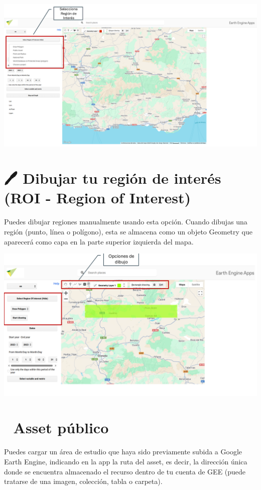 \documentclass[
]{book}
\begin{document}
\includegraphics{assets/ROI_es.png}

\section{\texorpdfstring{\textbf{🖊️ Dibujar tu región de interés (ROI - Region of Interest)}}{🖊️ Dibujar tu región de interés (ROI - Region of Interest)}}\label{dibujar-tu-regiuxf3n-de-interuxe9s-roi---region-of-interest}

Puedes dibujar regiones manualmente usando esta opción. Cuando dibujas una región (punto, línea o polígono), esta se almacena como un objeto Geometry que aparecerá como capa en la parte superior izquierda del mapa.

\includegraphics{assets/dibujado.png}

\section{\texorpdfstring{\textbf{📂 Asset público}}{📂 Asset público}}\label{asset-puxfablico}

Puedes cargar un área de estudio que haya sido previamente subida a Google Earth Engine, indicando en la app la ruta del asset, es decir, la dirección única donde se encuentra almacenado el recurso dentro de tu cuenta de GEE (puede tratarse de una imagen, colección, tabla o carpeta).
\end{document}
